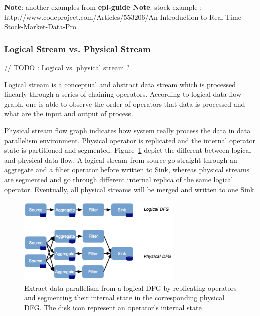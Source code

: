 \textbf{Note}: another examples from \textbf{epl-guide}
\textbf{Note}: stock example : http://www.codeproject.com/Articles/553206/An-Introduction-to-Real-Time-Stock-Market-Data-Pro


\subsubsection*{Logical Stream vs. Physical Stream}
// TODO : Logical vs. physical stream ?  \citep{Kramer:2009}

Logical stream is a conceptual and abstract data stream which is processed linearly through a series of chaining operators. According to logical data flow graph, one is able to observe the order of operators that data is processed and what are the input and output of process.

Physical stream flow graph indicates how system really process the data in data parallelism environment. Physical operator is replicated and the internal operator state is partitioned and segmented. Figure~\ref{fig:streamRepresent} depict the different between logical and physical data flow.
A logical stream from source go straight through an aggregate and a filter operator before written to Sink, whereas physical streams are segmented and go through different internal replica of the same logical operator. Eventually, all physical streams will be merged and written to one Sink. 


\begin{figure}[htbp!] 
\centering    
\includegraphics[width=0.7\textwidth]{logicalPhysicalDataFlow}
\caption[Minion]{Extract data parallelism from a logical DFG by replicating operators and segmenting their internal state in the corresponding physical DFG. The disk icon represent an operator's internal state \citep{Henrique:2013}}
\label{fig:streamRepresent}
\end{figure}

